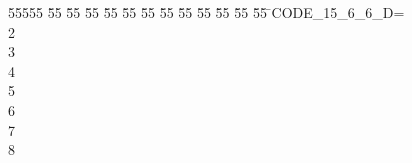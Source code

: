 %
%
\begin{tabbing}
55555 \= 55 \= 55 \= 55 \= 55 \= 55 \= 55 \= 55 \= 55 \= 55 \= 55 \= 55 \= 55 \= \>CODE\_15\_6\_6\_D=\\[0pt]
2\ \\[0pt]
3\ \\[0pt]
4\ \\[0pt]
5\ \\[0pt]
6\ \\[0pt]
7\\[0pt]
8\>\end{tabbing}
